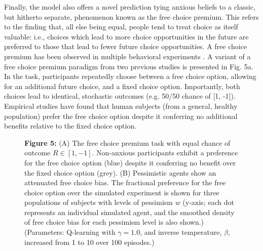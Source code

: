 \documentclass[11pt]{article} %
\begin{document}
Finally, the model also offers a novel prediction tying anxious beliefs to a classic, but hitherto separate, phenomenon known as the free choice premium. This refers to the finding that, all else being equal, people tend to treat choice as itself valuable: i.e., choices which lead to more choice opportunities in the future are preferred to those that lead to fewer future choice opportunities. A free choice premium has been observed in multiple behavioral experiments \cite{Leotti2010, ly2019}. A variant of a free choice premium paradigm from two previous studies\cite{Leotti2011,Leotti2014} is presented in Fig. 5a. In the task, participants repeatedly choose between a free choice option, allowing for an additional future choice, and a fixed choice option. Importantly, both choices lead to identical, stochastic outcomes (e.g. 50/50 chance of [1, -1]). Empirical studies have found that human subjects (from a general, healthy population) prefer the free choice option despite it conferring no additional benefits relative to the fixed choice option. 

\begin{figure}[t]
  \centerline{%
  }
  \par \textbf{Figure 5:} (A) The free choice premium task\cite{Leotti2011,Leotti2014} with equal chance of outcome $R \in [1, -1]$. Non-anxious participants exhibit a preference for the free choice option (blue) despite it conferring no benefit over the fixed choice option (grey). (B) Pessimistic agents show an attenuated free choice bias. The fractional preference for the free choice option over the simulated experiment is shown for three populations of subjects with levels of pessimism $w$ (y-axis; each dot represents an individual simulated agent, and the smoothed density of free choice bias for each pessimism level is also shown.)
  (Parameters: Q-learning with $\gamma = 1.0$, and inverse temperature, $\beta$, increased from 1 to 10 over 100 episodes.)
\end{figure}
\end{document}
